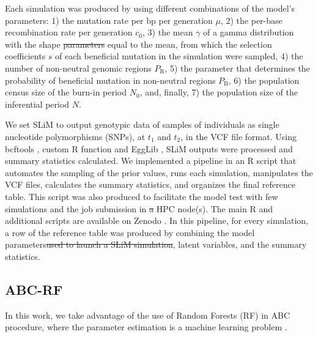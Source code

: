 \documentclass[a4paper, 12pt]{article}
\providecommand{\DIFaddtex}[1]{{\protect\color{blue}\uwave{#1}}} %
\providecommand{\DIFdeltex}[1]{{\protect\color{red}\sout{#1}}}                      %
\providecommand{\DIFaddbegin}{} %
\providecommand{\DIFaddend}{} %
\providecommand{\DIFdelbegin}{} %
\providecommand{\DIFdelend}{} %
\providecommand{\DIFadd}[1]{\texorpdfstring{\DIFaddtex{#1}}{#1}} %
\providecommand{\DIFdel}[1]{\texorpdfstring{\DIFdeltex{#1}}{}} %
\newcommand{\DIFscaledelfig}{0.5}
\newlength{\DIFdelgraphicswidth} %
\newlength{\DIFdelgraphicsheight} %
\newcommand{\DIFaddincludegraphics}[2][]{{\color{blue}\fbox{\DIFOincludegraphics[#1]{#2}}}} %
\newcommand{\DIFdelincludegraphics}[2][]{%
\sbox{\DIFdelgraphicsbox}{\DIFOincludegraphics[#1]{#2}}%
\settoboxwidth{\DIFdelgraphicswidth}{\DIFdelgraphicsbox} %
\settoboxtotalheight{\DIFdelgraphicsheight}{\DIFdelgraphicsbox} %
\scalebox{\DIFscaledelfig}{%
\parbox[b]{\DIFdelgraphicswidth}{\usebox{\DIFdelgraphicsbox}\\[-\baselineskip] \rule{\DIFdelgraphicswidth}{0em}}\llap{\resizebox{\DIFdelgraphicswidth}{\DIFdelgraphicsheight}{%
\setlength{\unitlength}{\DIFdelgraphicswidth}%
\begin{picture}(1,1)%
\thicklines\linethickness{2pt} %
{\color[rgb]{1,0,0}\put(0,0){\framebox(1,1){}}}%
{\color[rgb]{1,0,0}\put(0,0){\line( 1,1){1}}}%
{\color[rgb]{1,0,0}\put(0,1){\line(1,-1){1}}}%
\end{picture}%
}\hspace*{3pt}}} %
} %
\DeclareRobustCommand{\DIFaddbegin}{\DIFOaddbegin \let\includegraphics\DIFaddincludegraphics} %
\DeclareRobustCommand{\DIFaddend}{\DIFOaddend \let\includegraphics\DIFOincludegraphics} %
\DeclareRobustCommand{\DIFdelbegin}{\DIFOdelbegin \let\includegraphics\DIFdelincludegraphics} %
\DeclareRobustCommand{\DIFdelend}{\DIFOaddend \let\includegraphics\DIFOincludegraphics} %
\begin{document}
Each simulation was produced by using different combinations of the model's parameters: 1) the mutation rate per bp per generation $\mu$, 2) the per-base recombination rate per generation \DIFdelbegin \DIFdel{$c_{\mathrm{0}}$}\DIFdelend \DIFaddbegin \DIFadd{$r$}\DIFaddend , 3) the mean $\gamma$ of a gamma distribution \DIFaddbegin \DIFadd{(}\DIFaddend with the shape \DIFdelbegin \DIFdel{parameters }\DIFdelend \DIFaddbegin \DIFadd{parameter }\DIFaddend equal to the mean\DIFaddbegin \DIFadd{)}\DIFaddend , from which the selection coefficients $s$ of each beneficial mutation in the simulation were sampled, 4) the number of non-neutral genomic regions $P_\mathrm{R}$, 5) the parameter that determines the probability of beneficial mutation in non-neutral regions $P_\mathrm{B}$, 6) the population census size of the burn-in period $N_\mathrm{0}$, and, finally, 7) the population size of the inferential period $N$.

We set SLiM to output genotypic data of samples of individuals as single nucleotide polymorphisms (SNPs), at $t_1$ and $t_2$, in the VCF file format. Using bcftools \citep{Li:2011kr}, custom R function \citep{Rcore} and EggLib \citep{DeMita:2012dx}, SLiM outputs were processed and summary statistics calculated. We implemented a pipeline in an R script that automates the sampling of the prior values, runs each simulation, manipulates the VCF files, calculates the summary statistics, and organizes the final reference table. This script was also produced to facilitate the model test with few simulations and the job submission in \DIFdelbegin \DIFdel{a }\DIFdelend \DIFaddbegin \DIFadd{an }\DIFaddend HPC node(s). The main R and additional scripts are available on Zenodo \citep{Pavinato:2021}. In this pipeline, for every simulation, a row of the reference table was produced by combining the model parameters\DIFdelbegin \DIFdel{used to launch a SLiM simulation}\DIFdelend , latent variables, and the summary statistics.

\subsection*{ABC-RF}

In this work, we take advantage of the use of Random Forests (RF) in \DIFaddbegin \DIFadd{the }\DIFaddend ABC procedure, where the parameter estimation is a machine learning problem \citep{Pudlo:2016il, Raynal:2019jj}. \DIFdelbegin %
\end{document}
